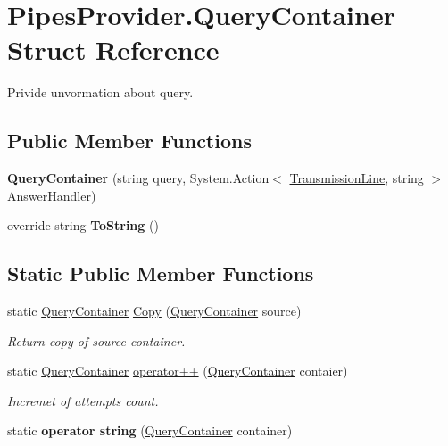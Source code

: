 \hypertarget{struct_pipes_provider_1_1_query_container}{}\section{Pipes\+Provider.\+Query\+Container Struct Reference}
\label{struct_pipes_provider_1_1_query_container}


Privide unvormation about query.  


\subsection*{Public Member Functions}
\begin{DoxyCompactItemize}
\item 
\mbox{\label{struct_pipes_provider_1_1_query_container_aa607957de2e6f04d20cadfa30f0ddfbd}} 
{\bfseries Query\+Container} (string query, System.\+Action$<$ \mbox{\hyperlink{class_pipes_provider_1_1_transmission_line}{Transmission\+Line}}, string $>$ \mbox{\hyperlink{struct_pipes_provider_1_1_query_container_aa04364ca7f1fc51a91671d1d74b8d810}{Answer\+Handler}})
\item 
\mbox{\label{struct_pipes_provider_1_1_query_container_ae1f22042b19452f4037480d531f8ea86}} 
override string {\bfseries To\+String} ()
\end{DoxyCompactItemize}
\subsection*{Static Public Member Functions}
\begin{DoxyCompactItemize}
\item 
static \mbox{\hyperlink{struct_pipes_provider_1_1_query_container}{Query\+Container}} \mbox{\hyperlink{struct_pipes_provider_1_1_query_container_a4b91c3b8947613c8326451df7a1ff2a0}{Copy}} (\mbox{\hyperlink{struct_pipes_provider_1_1_query_container}{Query\+Container}} source)
\begin{DoxyCompactList}\small\item\em Return copy of source container. \end{DoxyCompactList}\item 
static \mbox{\hyperlink{struct_pipes_provider_1_1_query_container}{Query\+Container}} \mbox{\hyperlink{struct_pipes_provider_1_1_query_container_abebe8bf09a00209626a0e13c0db64b27}{operator++}} (\mbox{\hyperlink{struct_pipes_provider_1_1_query_container}{Query\+Container}} contaier)
\begin{DoxyCompactList}\small\item\em Incremet of attempts count. \end{DoxyCompactList}\item 
\mbox{\label{struct_pipes_provider_1_1_query_container_a5eb5c53a2438e58e2f284c1b4a049d24}} 
static {\bfseries operator string} (\mbox{\hyperlink{struct_pipes_provider_1_1_query_container}{Query\+Container}} container)
\end{DoxyCompactItemize}
